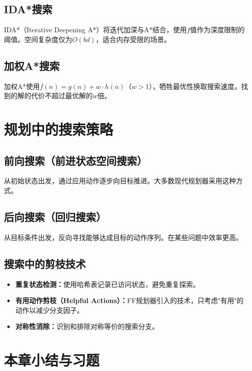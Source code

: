 \subsection{IDA*搜索}

IDA*（Iterative Deepening A*）将迭代加深与A*结合，使用$f$值作为深度限制的阈值。空间复杂度仅为$O(bd)$，适合内存受限的场景。

\subsection{加权A*搜索 \grad}

加权A*使用$f(n) = g(n) + w \cdot h(n)$（$w > 1$），牺牲最优性换取搜索速度。找到的解的代价不超过最优解的$w$倍。

\section{规划中的搜索策略}

\subsection{前向搜索（前进状态空间搜索）}

从初始状态出发，通过应用动作逐步向目标推进。大多数现代规划器采用这种方式。

\subsection{后向搜索（回归搜索）}

从目标条件出发，反向寻找能够达成目标的动作序列。在某些问题中效率更高。

\subsection{搜索中的剪枝技术}

\begin{itemize}
  \item \textbf{重复状态检测：}使用哈希表记录已访问状态，避免重复探索。
  \item \textbf{有用动作剪枝（Helpful Actions）：}FF规划器引入的技术，只考虑"有用"的动作以减少分支因子。
  \item \textbf{对称性消除：}识别和排除对称等价的搜索分支。
\end{itemize}

\section{本章小结与习题}

